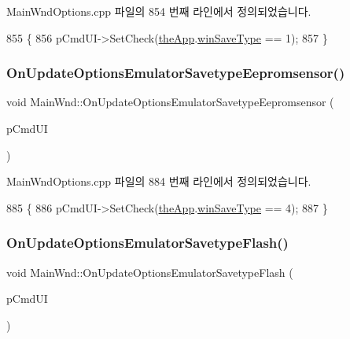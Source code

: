 Main\+Wnd\+Options.\+cpp 파일의 854 번째 라인에서 정의되었습니다.


\begin{DoxyCode}
855 \{
856   pCmdUI->SetCheck(\mbox{\hyperlink{_v_b_a_8cpp_a8095a9d06b37a7efe3723f3218ad8fb3}{theApp}}.\mbox{\hyperlink{class_v_b_a_a70060f88010280739406c87ef66d036a}{winSaveType}} == 1);
857 \}
\end{DoxyCode}
\mbox{\label{class_main_wnd_afc4b0435b25dfd00d358f2ad05b5193a}} 
\subsubsection{\texorpdfstring{On\+Update\+Options\+Emulator\+Savetype\+Eepromsensor()}{OnUpdateOptionsEmulatorSavetypeEepromsensor()}}
{\footnotesize\ttfamily void Main\+Wnd\+::\+On\+Update\+Options\+Emulator\+Savetype\+Eepromsensor (\begin{DoxyParamCaption}\item[{C\+Cmd\+UI $\ast$}]{p\+Cmd\+UI }\end{DoxyParamCaption})\hspace{0.3cm}{\ttfamily [protected]}}



Main\+Wnd\+Options.\+cpp 파일의 884 번째 라인에서 정의되었습니다.


\begin{DoxyCode}
885 \{
886   pCmdUI->SetCheck(\mbox{\hyperlink{_v_b_a_8cpp_a8095a9d06b37a7efe3723f3218ad8fb3}{theApp}}.\mbox{\hyperlink{class_v_b_a_a70060f88010280739406c87ef66d036a}{winSaveType}} == 4);
887 \}
\end{DoxyCode}
\mbox{\label{class_main_wnd_a70b80fcf494b4d70c006956144170803}} 
\subsubsection{\texorpdfstring{On\+Update\+Options\+Emulator\+Savetype\+Flash()}{OnUpdateOptionsEmulatorSavetypeFlash()}}
{\footnotesize\ttfamily void Main\+Wnd\+::\+On\+Update\+Options\+Emulator\+Savetype\+Flash (\begin{DoxyParamCaption}\item[{C\+Cmd\+UI $\ast$}]{p\+Cmd\+UI }\end{DoxyParamCaption})\hspace{0.3cm}{\ttfamily [protected]}}



